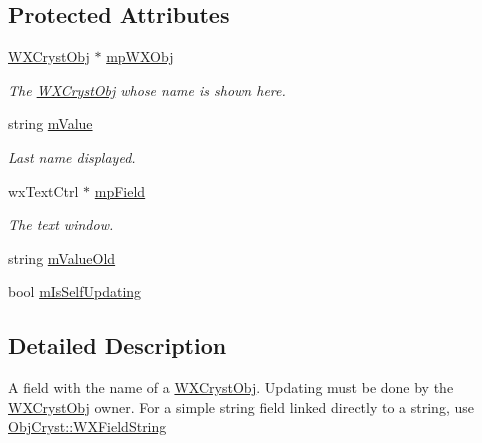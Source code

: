 \subsection*{Protected Attributes}
\begin{DoxyCompactItemize}
\item 
\mbox{\label{class_obj_cryst_1_1_w_x_field_name_aeba41442b5b3c426315c2278169a6a41}} 
\mbox{\hyperlink{class_obj_cryst_1_1_w_x_cryst_obj}{W\+X\+Cryst\+Obj}} $\ast$ \mbox{\hyperlink{class_obj_cryst_1_1_w_x_field_name_aeba41442b5b3c426315c2278169a6a41}{mp\+W\+X\+Obj}}
\begin{DoxyCompactList}\small\item\em The \mbox{\hyperlink{class_obj_cryst_1_1_w_x_cryst_obj}{W\+X\+Cryst\+Obj}} whose name is shown here. \end{DoxyCompactList}\item 
\mbox{\label{class_obj_cryst_1_1_w_x_field_name_aa39d895ae2ddba6475338fe753a94465}} 
string \mbox{\hyperlink{class_obj_cryst_1_1_w_x_field_name_aa39d895ae2ddba6475338fe753a94465}{m\+Value}}
\begin{DoxyCompactList}\small\item\em Last name displayed. \end{DoxyCompactList}\item 
\mbox{\label{class_obj_cryst_1_1_w_x_field_name_a0d475cb9a61594ce430ce594f01a3829}} 
wx\+Text\+Ctrl $\ast$ \mbox{\hyperlink{class_obj_cryst_1_1_w_x_field_name_a0d475cb9a61594ce430ce594f01a3829}{mp\+Field}}
\begin{DoxyCompactList}\small\item\em The text window. \end{DoxyCompactList}\item 
string \mbox{\hyperlink{class_obj_cryst_1_1_w_x_field_name_a4df82f08ebf86ee9cbc981c57a197202}{m\+Value\+Old}}
\item 
bool \mbox{\hyperlink{class_obj_cryst_1_1_w_x_field_name_a55d08ae80f82be85b66e66c4ded8eeb5}{m\+Is\+Self\+Updating}}
\end{DoxyCompactItemize}


\subsection{Detailed Description}
A field with the name of a \mbox{\hyperlink{class_obj_cryst_1_1_w_x_cryst_obj}{W\+X\+Cryst\+Obj}}. Updating must be done by the \mbox{\hyperlink{class_obj_cryst_1_1_w_x_cryst_obj}{W\+X\+Cryst\+Obj}} owner. For a simple string field linked directly to a string, use \mbox{\hyperlink{class_obj_cryst_1_1_w_x_field_string}{Obj\+Cryst\+::\+W\+X\+Field\+String}} 

